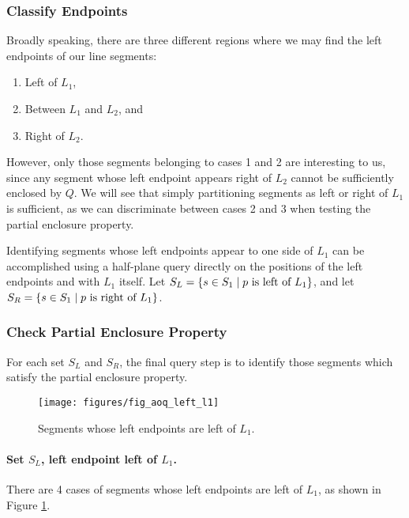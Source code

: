 \subsubsection{Classify Endpoints}
\label{:slabs:one:details:classify}

Broadly speaking, there are three different regions where we may find the left endpoints of our line segments:
\begin{enumerate}
 \item Left of $L_1$,
 \item Between $L_1$ and $L_2$, and
 \item Right of $L_2$.
\end{enumerate}

However, only those segments belonging to cases 1 and 2 are interesting to us, since any segment whose left endpoint appears right of $L_2$ cannot be sufficiently enclosed by $Q$. 
We will see that simply partitioning segments as left or right of $L_1$ is sufficient, as we can discriminate between cases 2 and 3 when testing the partial enclosure property.

Identifying segments whose left endpoints appear to one side of $L_1$ can be accomplished using a half-plane query directly on the positions of the left endpoints and with $L_1$ itself.  Let $S_L = \{ s \in S_1 \;|\; p \text{ is left of } L_1 \}$, and let $S_R = \{ s \in S_1 \;|\; p \text{ is right of } L_1 \}$.


\subsubsection{Check Partial Enclosure Property}
\label{:slabs:one:details:pep}

For each set $S_L$ and $S_R$, the final query step is to identify those segments which satisfy the partial enclosure property.

\begin{figure}[t]
\begin{center}
  \texttt{[image: figures/fig\_aoq\_left\_l1]}
  \caption{Segments whose left endpoints are left of $L_1$.}
  \label{fig:slabs:one:aoq_left_l1}
\end{center}
\end{figure}

\paragraph{Set $S_L$, left endpoint left of $L_1$.} There are 4 cases of segments whose left endpoints are left of $L_1$, as shown in Figure \ref{fig:slabs:one:aoq_left_l1}.

